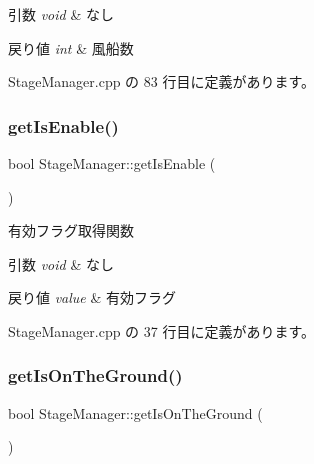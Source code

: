 \begin{DoxyParams}{引数}
{\em void} & なし \\
\hline
\end{DoxyParams}

\begin{DoxyRetVals}{戻り値}
{\em int} & 風船数 \\
\hline
\end{DoxyRetVals}


 Stage\+Manager.\+cpp の 83 行目に定義があります。

\mbox{\label{class_stage_manager_ad250f6b9d743f80e67f449abb49e7ac2}} 
\subsubsection{\texorpdfstring{get\+Is\+Enable()}{getIsEnable()}}
{\footnotesize\ttfamily bool Stage\+Manager\+::get\+Is\+Enable (\begin{DoxyParamCaption}{ }\end{DoxyParamCaption})}



有効フラグ取得関数 


\begin{DoxyParams}{引数}
{\em void} & なし \\
\hline
\end{DoxyParams}

\begin{DoxyRetVals}{戻り値}
{\em value} & 有効フラグ \\
\hline
\end{DoxyRetVals}


 Stage\+Manager.\+cpp の 37 行目に定義があります。

\mbox{\label{class_stage_manager_a9681b6ab1d4c6b414bc81af515d1f20d}} 
\subsubsection{\texorpdfstring{get\+Is\+On\+The\+Ground()}{getIsOnTheGround()}}
{\footnotesize\ttfamily bool Stage\+Manager\+::get\+Is\+On\+The\+Ground (\begin{DoxyParamCaption}{ }\end{DoxyParamCaption})}



